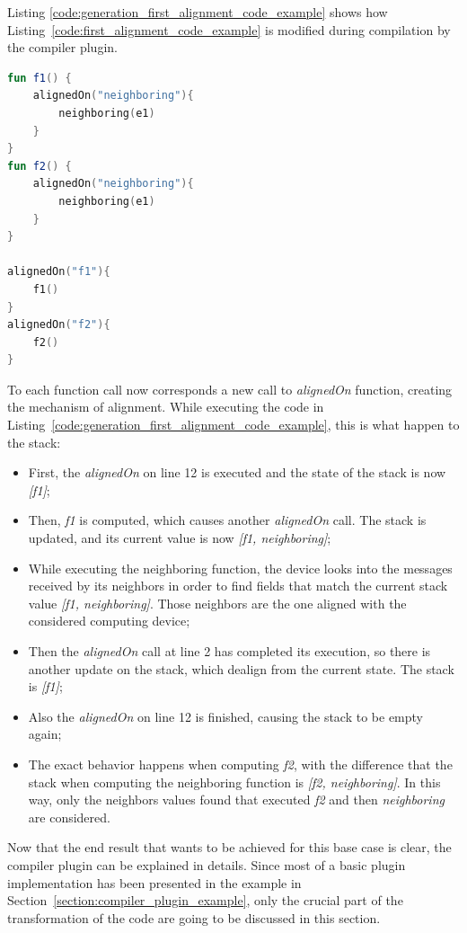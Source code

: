 Listing \ref{code:generation_first_alignment_code_example} shows how Listing~\ref{code:first_alignment_code_example} is modified during compilation by the compiler plugin.
\begin{lstlisting}[caption={Generation goal to handle the alignment of Listing~\ref{code:first_alignment_code_example}}, captionpos=b, language=Kotlin, label={code:generation_first_alignment_code_example}]
fun f1() {
    alignedOn("neighboring"){
        neighboring(e1)
    }
}
fun f2() {
    alignedOn("neighboring"){
        neighboring(e1)
    }
}
            
alignedOn("f1"){
    f1()
}
alignedOn("f2"){
    f2()
}
\end{lstlisting}
To each function call now corresponds a new call to \textit{alignedOn} function, creating the mechanism of alignment.\newline
While executing the code in Listing~\ref{code:generation_first_alignment_code_example}, this is what happen to the stack:
\begin{itemize}
    \item First, the \textit{alignedOn} on line 12 is executed and the state of the stack is now \textit{[f1]};
    \item Then, \textit{f1} is computed, which causes another \textit{alignedOn} call. The stack is updated, and its current value is now \textit{[f1, neighboring]};
    \item While executing the neighboring function, the device looks into the messages received by its neighbors in order to find fields that match the current stack value \textit{[f1, neighboring]}. Those neighbors are the one aligned with the considered computing device;
    \item Then the \textit{alignedOn} call at line 2 has completed its execution, so there is another update on the stack, which dealign from the current state. The stack is \textit{[f1]};
    \item Also the \textit{alignedOn} on line 12 is finished, causing the stack to be empty again;
    \item The exact behavior happens when computing \textit{f2}, with the difference that the stack when computing the neighboring function is \textit{[f2, neighboring]}. In this way, only the neighbors values found that executed \textit{f2} and then \textit{neighboring} are considered.
\end{itemize}

Now that the end result that wants to be achieved for this base case is clear, the compiler plugin can be explained in details.\newline
Since most of a basic plugin implementation has been presented in the example in Section~\ref{section:compiler_plugin_example}, only the crucial part of the transformation of the code are going to be discussed in this section.

